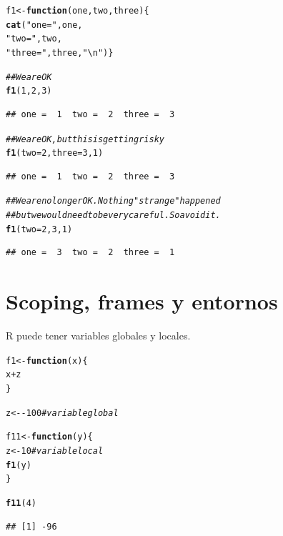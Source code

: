 \documentclass{config/apuntes}\usepackage[]{graphicx}\usepackage[]{xcolor}
\makeatletter
\newcommand{\hlnum}[1]{\textcolor[rgb]{0.686,0.059,0.569}{#1}}%
\newcommand{\hlsng}[1]{\textcolor[rgb]{0.192,0.494,0.8}{#1}}%
\newcommand{\hlcom}[1]{\textcolor[rgb]{0.678,0.584,0.686}{\textit{#1}}}%
\newcommand{\hlopt}[1]{\textcolor[rgb]{0,0,0}{#1}}%
\newcommand{\hldef}[1]{\textcolor[rgb]{0.345,0.345,0.345}{#1}}%
\newcommand{\hlkwa}[1]{\textcolor[rgb]{0.161,0.373,0.58}{\textbf{#1}}}%
\newcommand{\hlkwb}[1]{\textcolor[rgb]{0.69,0.353,0.396}{#1}}%
\newcommand{\hlkwc}[1]{\textcolor[rgb]{0.333,0.667,0.333}{#1}}%
\newcommand{\hlkwd}[1]{\textcolor[rgb]{0.737,0.353,0.396}{\textbf{#1}}}%
\newenvironment{kframe}{%
 \def\at@end@of@kframe{}%
 \ifinner\ifhmode%
  \def\at@end@of@kframe{\end{minipage}}%
  \begin{minipage}{\columnwidth}%
 \fi\fi%
 \def\FrameCommand##1{\hskip\@totalleftmargin \hskip-\fboxsep
 \colorbox{shadecolor}{##1}\hskip-\fboxsep
     \hskip-\linewidth \hskip-\@totalleftmargin \hskip\columnwidth}%
 \MakeFramed {\advance\hsize-\width
   \@totalleftmargin\z@ \linewidth\hsize
   \@setminipage}}%
 {\par\unskip\endMakeFramed%
 \at@end@of@kframe}
\newenvironment{knitrout}{}{} %
\makeatother
\begin{document}
\begin{knitrout}
\color{fgcolor}\begin{kframe}
\begin{alltt}
\hldef{f1} \hlkwb{<-} \hlkwa{function}\hldef{(}\hlkwc{one}\hldef{,} \hlkwc{two}\hldef{,} \hlkwc{three}\hldef{) \{}
    \hlkwd{cat}\hldef{(}\hlsng{"one = "}\hldef{, one,}
        \hlsng{" two = "}\hldef{, two,}
        \hlsng{" three = "}\hldef{, three,} \hlsng{"\textbackslash{}n"}\hldef{)\}}

\hlcom{## We are OK}
\hlkwd{f1}\hldef{(}\hlnum{1}\hldef{,} \hlnum{2}\hldef{,} \hlnum{3}\hldef{)}
\end{alltt}
\begin{verbatim}
## one =  1  two =  2  three =  3
\end{verbatim}
\begin{alltt}
\hlcom{## We are OK, but this is getting risky}
\hlkwd{f1}\hldef{(}\hlkwc{two} \hldef{=} \hlnum{2}\hldef{,} \hlkwc{three} \hldef{=} \hlnum{3}\hldef{,} \hlnum{1}\hldef{)}
\end{alltt}
\begin{verbatim}
## one =  1  two =  2  three =  3
\end{verbatim}
\begin{alltt}
\hlcom{## We are no longer OK. Nothing "strange" happened}
\hlcom{## but we would need to be very careful. So avoid it.}
\hlkwd{f1}\hldef{(}\hlkwc{two} \hldef{=} \hlnum{2}\hldef{,} \hlnum{3}\hldef{,} \hlnum{1}\hldef{)}
\end{alltt}
\begin{verbatim}
## one =  3  two =  2  three =  1
\end{verbatim}
\end{kframe}
\end{knitrout}

\section{Scoping, frames y entornos}
R puede tener variables globales y locales. 

\begin{knitrout}
\color{fgcolor}\begin{kframe}
\begin{alltt}
\hldef{f1} \hlkwb{<-} \hlkwa{function}\hldef{(}\hlkwc{x}\hldef{) \{}
    \hldef{x} \hlopt{+} \hldef{z}
\hldef{\}}

\hldef{z} \hlkwb{<-} \hlopt{-}\hlnum{100} \hlcom{#variable global}

\hldef{f11} \hlkwb{<-} \hlkwa{function}\hldef{(}\hlkwc{y}\hldef{) \{}
    \hldef{z} \hlkwb{<-} \hlnum{10} \hlcom{#variable local}
    \hlkwd{f1}\hldef{(y)}
\hldef{\}}

\hlkwd{f11}\hldef{(}\hlnum{4}\hldef{)}
\end{alltt}
\begin{verbatim}
## [1] -96
\end{verbatim}
\end{kframe}
\end{knitrout}
\end{document}
